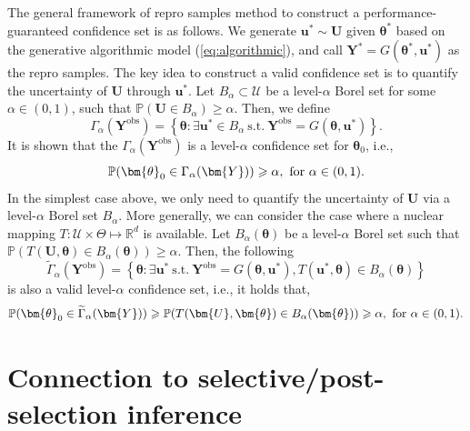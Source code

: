 \documentclass[11pt, reqno]{amsart}
\newcommand{\R}{\mathbb{R}}
\newcommand{\bP}{\mathbb{P}}
\renewcommand{\tilde}{\widetilde}
\renewcommand{\ge}{\geqslant}
\newcommand{\1}{\mbox{1}\hspace{-0.25em}\mbox{l}}
\theoremstyle{definition}\newtheorem{problem}{Problem}[section]
\theoremstyle{definition}\newtheorem{definition}[problem]{Definition}
\theoremstyle{remark}\newtheorem{assumption}{Assumption}
\theoremstyle{remark}\newtheorem{remark}[problem]{Remark}
\theoremstyle{definition}\newtheorem{example}[problem]{Example}
\theoremstyle{plain}\newtheorem{theorem}[problem]{Theorem}
\theoremstyle{plain}\newtheorem{question}[problem]{Question}
\theoremstyle{plain}\newtheorem{lemma}[problem]{Lemma}
\theoremstyle{plain}\newtheorem{proposition}[problem]{Proposition}
\theoremstyle{plain}\newtheorem{corollary}[problem]{Corollary}
\theoremstyle{plain}\newtheorem{conjecture}[problem]{Conjecture}
\begin{document}
The general framework of repro samples method to construct a performance-guaranteed confidence set is as follows. We generate $\bm{u}^{*} \sim \bm{U}$ given $\bm{\theta}^{*}$ based on the generative algorithmic model (\ref{eq:algorithmic}), and call $\bm{Y}^{*} = G(\bm{\theta}^{*}, \bm{u}^{*})$ as the repro samples. The key idea to construct a valid confidence set is to quantify the uncertainty of $\bm{U}$ through $\bm{u}^{*}$. Let $B_\alpha \subset \mathcal{U}$ be a level-$\alpha$ Borel set for some $\alpha \in (0,1)$, such that $\bP(\bm{U} \in B_\alpha) \ge \alpha$. Then, we define 
\begin{equation*}
    \Gamma_\alpha(\bm{Y}^{\mathrm{obs}}) = \left\{ \bm{\theta} : \exists \bm{u}^{*} \in B_\alpha \ \mathrm{s.t.}\ \bm{Y}^{\mathrm{obs}} = G(\bm{\theta}, \bm{u}^{*}) \right\}.
\end{equation*}
It is shown that the $\Gamma_\alpha(\bm{Y}^{\mathrm{obs}})$ is a level-$\alpha$ confidence set for $\bm{\theta}_{0}$, i.e.,
    \[
    \bP(\bm{\theta}_{0} \in \Gamma_\alpha(\bm{Y})) \ge \alpha,\ \hbox{for }\alpha \in (0,1).
    \]
In the simplest case above, we only need to quantify the uncertainty of $\bm{U}$ via a level-$\alpha$ Borel set $B_\alpha$. More generally, we can consider the case where a nuclear mapping $T: \mathcal{U} \times \Theta \mapsto \R^d$ is available. Let $B_\alpha(\bm{\theta})$ be a level-$\alpha$ Borel set such that $\bP(T(\bm{U}, \bm{\theta}) \in B_\alpha(\bm{\theta}) )\ge \alpha$. Then, the following
\begin{equation}\label{eq:confidence set2}
    \tilde{\Gamma}_\alpha(\bm{Y}^{\mathrm{obs}}) = \left\{ \bm{\theta} : \exists \bm{u}^{*} \ \mathrm{s.t.}\ \bm{Y}^{\mathrm{obs}} = G(\bm{\theta}, \bm{u}^{*}),  T(\bm{u}^*, \bm{\theta}) \in B_\alpha(\bm{\theta})\right\}
\end{equation}
is also a valid level-$\alpha$ confidence set, i.e., it holds that, 
\begin{equation}\label{eq:confidence set2 validity}
    \bP(\bm{\theta}_{0} \in  \tilde{\Gamma}_\alpha(\bm{Y})) \ge \bP(T(\bm{U}, \bm{\theta}) \in B_\alpha(\bm{\theta}) )\ge \alpha,\ \hbox{for }\alpha \in (0,1).
\end{equation}

\section{Connection to selective/post-selection inference}
\end{document}
